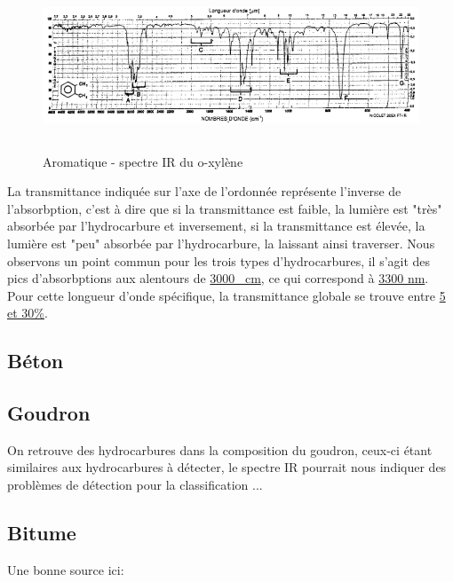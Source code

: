 \begin{figure}[H]
    \centering
    \includegraphics[height=5cm,angle=90]{assets/figures/aromatique.png}
    \caption{Aromatique - spectre IR du o-xylène \cite{Hydrocarbures}}
\end{figure}

\newpage
La transmittance indiquée sur l'axe de l'ordonnée représente l'inverse de l'absorbption, c'est à dire que si la transmittance est faible, la lumière
est "très" absorbée par l'hydrocarbure et inversement, si la transmittance est élevée, la lumière est "peu" absorbée par l'hydrocarbure, la laissant ainsi traverser.
Nous observons un point commun pour les trois types d'hydrocarbures, il s'agit des pics d'absorbptions aux alentours de \underline{3000 \si{\per\centi\metre}}, ce qui correspond à \underline{3300 \si{\nano\metre}}.\\
Pour cette longueur d'onde spécifique, la transmittance globale se trouve entre \underline{5 et 30\%}.

\subsection{Béton}

\subsection{Goudron}
On retrouve des hydrocarbures dans la composition du goudron, ceux-ci étant similaires aux hydrocarbures à détecter, le spectre IR pourrait nous indiquer des problèmes de détection pour la classification ...

\subsection{Bitume}
Une bonne source ici: \cite{Bitume}
\\

